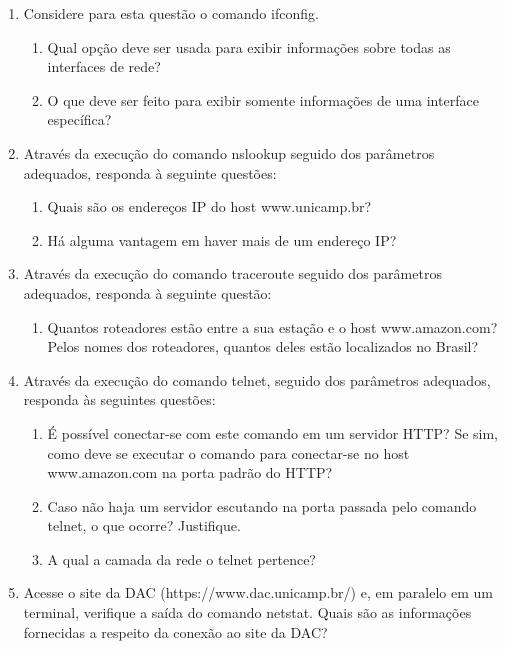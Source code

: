\documentclass[12pt,a4paper]{report}
\begin{document}
\begin{enumerate}
    \item Considere para esta questão o comando ifconfig.
    \begin{enumerate}
        \item Qual opção deve ser usada para exibir informações sobre todas as interfaces de rede?
        \item O que deve ser feito para exibir somente informações de uma interface específica? 
    \end{enumerate}
    
    \item Através da execução do comando nslookup seguido dos parâmetros adequados, responda à seguinte questões:
    \begin{enumerate}
        \item Quais são os endereços IP do host www.unicamp.br?
        \item Há alguma vantagem em haver mais de um endereço IP?
    \end{enumerate}
    
    \item Através da execução do comando traceroute seguido dos parâmetros adequados, responda à seguinte questão:
    \begin{enumerate}
        \item Quantos roteadores estão entre a sua estação e o host www.amazon.com? Pelos nomes dos roteadores, quantos deles estão localizados no Brasil?
    \end{enumerate}
    
    \item Através da execução do comando telnet, seguido dos parâmetros adequados, responda às seguintes questões:
    \begin{enumerate}
        \item É possível conectar-se com este comando em um servidor HTTP? Se sim, como deve se executar o comando para conectar-se no host www.amazon.com na porta padrão do HTTP?
        \item Caso não haja um servidor escutando na porta passada pelo comando telnet, o que ocorre? Justifique.
        \item A qual a camada da rede o telnet pertence?
    \end{enumerate}
    
    \item Acesse o site da DAC (https://www.dac.unicamp.br/) e, em paralelo em um terminal, verifique a saída do comando netstat. Quais são as informações fornecidas a respeito da conexão ao site da DAC?
    

\end{enumerate}
\end{document}

